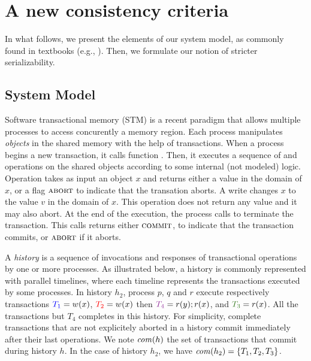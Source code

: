 \section{A new consistency criteria}

In what follows, we present the elements of our system model, as commonly found in textbooks (e.g., \cite{}).
Then, we formulate our notion of stricter serializability.

\subsection{System Model}

Software transactional memory (STM) is a recent paradigm that allows multiple processes to access concurently a memory region.
Each process manipulates \emph{objects} in the shared memory with the help of transactions.
When a process begins a new transaction, it calls function \stmBeginFunction.
Then, it executes a sequence of \stmReadFunction and \stmWriteFunction operations on the shared objects according to some internal (not modeled) logic.
Operation  takes as input an object $x$ and returns either a value in the domain of $x$, or a flag $\text{\textsc{abort}}$ to indicate that the transation aborts.
A write  changes $x$ to the value $v$ in the domain of $x$.
This operation does not return any value and it may also abort.
At the end of the execution, the process calls \stmTryCommitFunction to terminate the transaction.
This calls returns either $\text{\textsc{commit}}$, to indicate that the transaction commits, or $\text{\textsc{abort}}$ if it aborts.

A \emph{history} is a sequence of invocations and responses of transactional operations by one or more processes.
As illustrated below, a history is commonly represented with parallel timelines, where each timeline represents the transactions executed by some processes.
In history $h_2$, process $p$, $q$ and $r$ execute respectively transactions ${\color{blue}{T_1}}=w(x)$, ${\color{red}{T_2}}=w(x)$ then ${\color{Purple}{T_4}}=r(y);r(x)$, and ${\color{OliveGreen}{T_3}}=r(x)$.
All the transactions but $T_4$ completes in this history.
For simplicity, complete transactions that are not explicitely aborted in a history commit immediately after their last operations.
We note $\committed{h}$ the set of transactions that commit during history $h$.
In the case of history $h_2$, we have $\committed{h_2}=\{T_1,T_2,T_3\}$.



